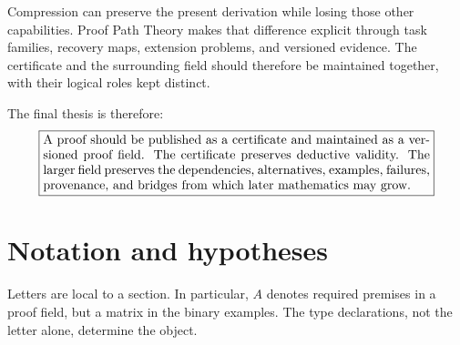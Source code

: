 \documentclass[11pt,oneside]{article}
\theoremstyle{komorebiplain}
\theoremstyle{komorebidefinition}
\theoremstyle{komorebiremark}
\begin{document}
Compression can preserve the present derivation while losing those other capabilities. Proof Path Theory makes that difference explicit through task families, recovery maps, extension problems, and versioned evidence. The certificate and the surrounding field should therefore be maintained together, with their logical roles kept distinct.

The final thesis is therefore:
\[
\boxed{\begin{minipage}{0.88\linewidth}
A proof should be published as a certificate and maintained as a versioned proof field. The certificate preserves deductive validity. The larger field preserves the dependencies, alternatives, examples, failures, provenance, and bridges from which later mathematics may grow.
\end{minipage}}
\]


\FloatBarrier
\clearpage
\appendix
{}
\section{Notation and hypotheses}
\label{app:notation}

Letters are local to a section. In particular, $A$ denotes required premises in a proof field, but a matrix in the binary examples. The type declarations, not the letter alone, determine the object.
\end{document}
